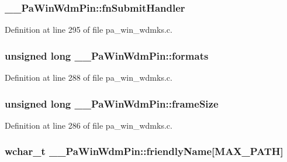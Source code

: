 \subsubsection[{\texorpdfstring{fn\+Submit\+Handler}{fnSubmitHandler}}]{ \+\_\+\+\_\+\+Pa\+Win\+Wdm\+Pin\+::fn\+Submit\+Handler}\hypertarget{struct_____pa_win_wdm_pin_a202ee56dc377eba26384ab00d6aa5779}{}\label{struct_____pa_win_wdm_pin_a202ee56dc377eba26384ab00d6aa5779}


Definition at line 295 of file pa\+\_\+win\+\_\+wdmks.\+c.

\subsubsection[{\texorpdfstring{formats}{formats}}]{\setlength{\rightskip}{0pt plus 5cm}unsigned long \+\_\+\+\_\+\+Pa\+Win\+Wdm\+Pin\+::formats}\hypertarget{struct_____pa_win_wdm_pin_aaa618474b3f5813e67f4ade59e6c9540}{}\label{struct_____pa_win_wdm_pin_aaa618474b3f5813e67f4ade59e6c9540}


Definition at line 288 of file pa\+\_\+win\+\_\+wdmks.\+c.

\subsubsection[{\texorpdfstring{frame\+Size}{frameSize}}]{\setlength{\rightskip}{0pt plus 5cm}unsigned long \+\_\+\+\_\+\+Pa\+Win\+Wdm\+Pin\+::frame\+Size}\hypertarget{struct_____pa_win_wdm_pin_a6c12dcae31c4badecb8bb36ed5fd7381}{}\label{struct_____pa_win_wdm_pin_a6c12dcae31c4badecb8bb36ed5fd7381}


Definition at line 286 of file pa\+\_\+win\+\_\+wdmks.\+c.

\subsubsection[{\texorpdfstring{friendly\+Name}{friendlyName}}]{\setlength{\rightskip}{0pt plus 5cm}wchar\+\_\+t \+\_\+\+\_\+\+Pa\+Win\+Wdm\+Pin\+::friendly\+Name\mbox{[}M\+A\+X\+\_\+\+P\+A\+TH\mbox{]}}\hypertarget{struct_____pa_win_wdm_pin_ad20963ecc38fe667f890dd6939b324a2}{}\label{struct_____pa_win_wdm_pin_ad20963ecc38fe667f890dd6939b324a2}


